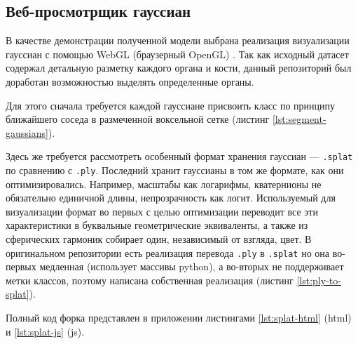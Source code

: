 \subsection{Веб-просмотрщик гауссиан}

В качестве демонстрации полученной модели выбрана реализация визуализации гауссиан с помощью WebGL (браузерный OpenGL) \cite{splat2024}. Так как исходный датасет содержал детальную разметку каждого органа и кости, данный репозиторий был доработан возможностью выделять определенные органы.

Для этого сначала требуется каждой гауссиане присвоить класс по принципу ближайшего соседа в размеченной воксельной сетке (листинг \ref{lst:segment-gaussians}).

Здесь же требуется рассмотреть особенный формат хранения гауссиан --- \texttt{.splat} по сравнению с \texttt{.ply}. Последний хранит гауссианы в том же формате, как они оптимизировались. Например, масштабы как логарифмы, кватернионы не обязательно единичной длины, непрозрачность как логит. Используемый для визуализации формат во первых с целью оптимизации переводит все эти характеристики в буквальные геометрические эквиваленты, а также из сферических гармоник собирает один, независимый от взгляда, цвет. В оригинальном репозитории есть реализация перевода \texttt{.ply} в \texttt{.splat} но она во-первых медленная (использует массивы python), а во-вторых не поддерживает метки классов, поэтому написана собственная реализация (листинг \ref{lst:ply-to-splat}).

Полный код форка представлен в приложении листингами \ref{lst:splat-html} (html) и \ref{lst:splat-js} (js).